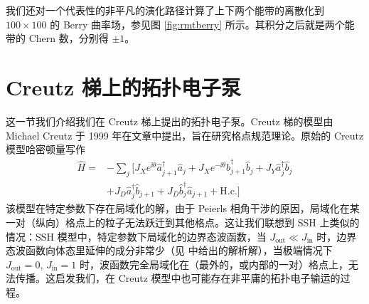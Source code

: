 我们还对一个代表性的非平凡的演化路径计算了上下两个能带的离散化到 $100\times100$ 的 Berry 曲率场，参见图 \ref{fig:rmtberry} 所示。其积分之后就是两个能带的 Chern 数，分别得 $\pm1$。



\section{ Creutz 梯上的拓扑电子泵}\label{sec:creutz}
这一节我们介绍我们在 Creutz 梯上提出的拓扑电子泵。Creutz 梯的模型由 Michael Creutz 于 1999 年在文章中提出，旨在研究格点规范理论。原始的 Creutz 模型哈密顿量写作
\begin{align}
\hat{H} =&-\sum_{j} [J_X e^{\ii\theta} \hat{a}_{j+1}^\dag \hat{a}_{j}+J_X e^{-\ii\theta} \hat{b}_{j+1}^\dag \hat{b}_{j} + J_Y \hat{a}_j^\dag \hat{b}_j 
\nonumber\\
&+ J_D \hat{a}_j^\dag \hat{b}_{j+1}+J_D \hat{b}_j^\dag \hat{a}_{j+1} +\textrm{H.c.}]
\end{align}
该模型在特定参数下存在局域化的解，由于 Peierls 相角干涉的原因，局域化在某一对（纵向）格点上的粒子无法跃迁到其他格点\cite{creutz1999}。这让我们联想到 SSH 上类似的情况：SSH 模型中，特定参数下局域化的边界态波函数，当 $J_{\text{out}}\ll J_{\text{in}}$ 时，边界态波函数向体态里延伸的成分非常少（见  中给出的解析解），当极端情况下 $J_{\text{out}}=0$, $J_{\text{in}}=1$ 时，波函数完全局域化在（最外的，或内部的一对）格点上，无法传播。这启发我们，在 Creutz 模型中也可能存在非平庸的拓扑电子输运的过程。

